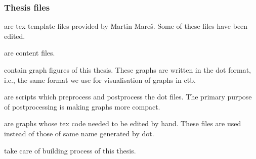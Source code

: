 \subsubsection{Thesis files}
\begin{description}
  \item {} are tex template files provided by Martin Mareš. Some of these files have been edited.
  \item {} are content files.
  \item {} contain graph figures of this thesis. These graphs are written in the dot format, i.e., the same format we use for visualisation of graphs in ctb.
  \item {} are scripts which preprocess and postprocess the dot files. The primary purpose of postprocessing is making graphs more compact. 
  \item {} are graphs whose tex code needed to be edited by hand. These files are used instead of those of same name generated by dot.
  \item {} take care of building process of this thesis. 
\end{description}


